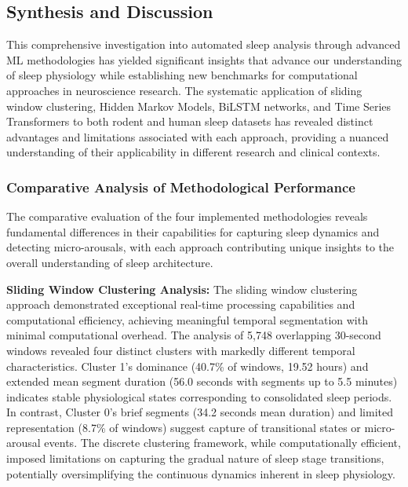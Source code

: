 \documentclass[a4paper,12pt,twoside]{article}
\begin{document}
\subsection{Synthesis and Discussion}

This comprehensive investigation into automated sleep analysis through advanced ML methodologies has yielded significant insights that advance our understanding of sleep physiology while establishing new benchmarks for computational approaches in neuroscience research. The systematic application of sliding window clustering, Hidden Markov Models, BiLSTM networks, and Time Series Transformers to both rodent and human sleep datasets has revealed distinct advantages and limitations associated with each approach, providing a nuanced understanding of their applicability in different research and clinical contexts.

\subsubsection{Comparative Analysis of Methodological Performance}

The comparative evaluation of the four implemented methodologies reveals fundamental differences in their capabilities for capturing sleep dynamics and detecting micro-arousals, with each approach contributing unique insights to the overall understanding of sleep architecture.

\textbf{Sliding Window Clustering Analysis:}
The sliding window clustering approach demonstrated exceptional real-time processing capabilities and computational efficiency, achieving meaningful temporal segmentation with minimal computational overhead. The analysis of 5,748 overlapping 30-second windows revealed four distinct clusters with markedly different temporal characteristics. Cluster 1's dominance (40.7\% of windows, 19.52 hours) and extended mean segment duration (56.0 seconds with segments up to 5.5 minutes) indicates stable physiological states corresponding to consolidated sleep periods. In contrast, Cluster 0's brief segments (34.2 seconds mean duration) and limited representation (8.7\% of windows) suggest capture of transitional states or micro-arousal events. The discrete clustering framework, while computationally efficient, imposed limitations on capturing the gradual nature of sleep stage transitions, potentially oversimplifying the continuous dynamics inherent in sleep physiology.
\end{document}
